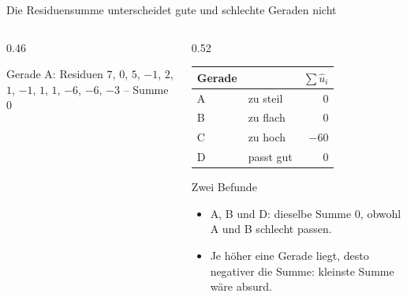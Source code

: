 \documentclass[aspectratio=169,11pt]{beamer}
\def\werbelist{1/33,3/30,4/37,5/33,6/38,8/41,8/39,9/43,10/45,11/40,12/42,13/47}
\newcommand{\werbepunkte}{\addplot[only marks, mark=*, mark size=2.2pt, color=hsbiblue]
  coordinates {(1,33) (3,30) (4,37) (5,33) (6,38) (8,41) (8,39) (9,43) (10,45) (11,40) (12,42) (13,47)};}
\newcommand{\residuenvon}[4]{%
  \foreach \px/\py in #1 {%
    \pgfmathsetmacro{\yh}{#2 + #3*\px}%
    \edef\tmpdraw{\noexpand\draw[#4] (axis cs:\px,\py) -- (axis cs:\px,\yh);}%
    \tmpdraw
  }}
\begin{document}
\begin{frame}{Die Residuensumme unterscheidet gute und schlechte Geraden nicht}
  \begin{columns}[T]
    \begin{column}{0.46\textwidth}
      \begin{center}\footnotesize
        Gerade A: Residuen $7$, $0$, $5$, $-1$, $2$, $1$, $-1$, $1$, $1$, $-6$, $-6$, $-3$
        -- Summe $0$
      \end{center}
    \end{column}
    \begin{column}{0.52\textwidth}
      \small
      \begin{center}
        \renewcommand{\arraystretch}{1.05}
        \begin{tabular}{llr}
          \toprule
          Gerade & & $\sum \hat{u}_i$ \\
          \midrule
          A & zu steil   & $0$   \\
          B & zu flach   & $0$   \\
          C & zu hoch    & $-60$ \\
          D & passt gut  & $0$   \\
          \bottomrule
        \end{tabular}
      \end{center}
      \begin{alertblock}{Zwei Befunde}
        \begin{itemize}
          \item A, B und D: dieselbe Summe $0$, obwohl A und B schlecht passen.
          \item Je höher eine Gerade liegt, desto negativer die Summe:
                \glqq kleinste Summe\grqq{} wäre absurd.
        \end{itemize}
      \end{alertblock}
    \end{column}
  \end{columns}
\end{frame}
\end{document}
